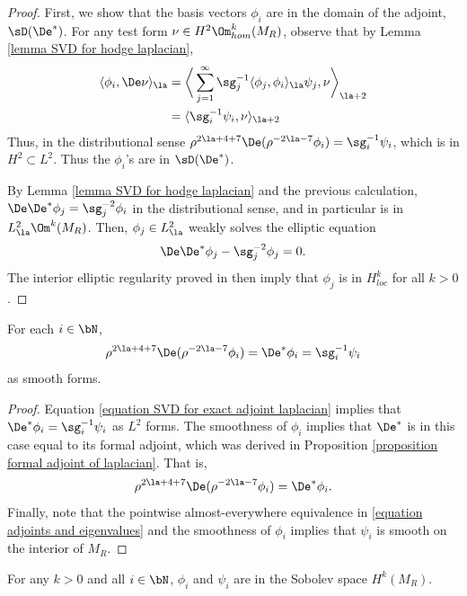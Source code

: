 \documentclass[hidelinks, 12pt, oneside, reqno]{amsart}
\begin{document}
\begin{proof}
First, we show that the basis vectors $\phi_i$ are in the domain of the adjoint, $\sD(\De^*)$. For any test form $\nu \in H^2 \Om^k_{hom}(M_R)$, observe that by Lemma \ref{lemma SVD for hodge laplacian}, 
\begin{align*}
    \langle \phi_i , \De \nu \rangle_{\la} &= \bigg \langle \sum_{j=1}^\infty \sg_j^{-1} \langle \phi_j, \phi_i \rangle_{\la} \psi_j, \nu \bigg\rangle_{\la+2}\\
    &= \langle \sg_i^{-1} \psi_i, \nu \rangle_{\la+2}
\end{align*}
Thus, in the distributional sense $\rho^{2\la + 4 + 7}\De(\rho^{-2\la -7}\phi_i) = \sg_i^{-1} \psi_i$, which is in $H^2 \subset L^2$. Thus the $\phi_i$'s are in $\sD(\De^*)$. 

By Lemma \ref{lemma SVD for hodge laplacian} and the previous calculation, $\De \De^* \phi_j = \sg_j^{-2} \phi_i$ in the distributional sense, and in particular is in $L^2_{\la}\Om^k(M_R)$. Then, $\phi_j \in L^2_{\la}$ weakly solves the elliptic equation 
\[
\De\De^* \phi_j - \sg_j^{-2} \phi_j = 0. 
\]
The interior elliptic regularity proved in \cite[Corollary 10.3.9]{NicolaescuManifoldLectures} then imply that $\phi_j$ is in $H^k_{loc}$ for all $k > 0$. 
\end{proof}

\begin{cor}\label{corollary equality of adjoints}
    For each $i \in \bN$, 
    \begin{equation}\label{equation adjoints and eigenvalues}
    \rho^{2\la + 4 +7} \De (\rho^{-2\la - 7} \phi_i) = \De^* \phi_i = \sg_i^{-1} \psi_i
    \end{equation}
    as smooth forms. 
\end{cor}

\begin{proof}
Equation \eqref{equation SVD for exact adjoint laplacian} implies that $\De^* \phi_i = \sg_i^{-1} \psi_i$ as $L^2$ forms.  The smoothness of $\phi_i$ implies that $\De^*$ is in this case equal to its formal adjoint, which was derived in Proposition \ref{proposition formal adjoint of laplacian}. That is,
\[
\rho^{2\la + 4 +7} \De (\rho^{-2\la - 7} \phi_i) = \De^* \phi_i.
\]
Finally, note that the pointwise almost-everywhere equivalence in \eqref{equation adjoints and eigenvalues} and the smoothness of $\phi_i$ implies that $\psi_i$ is smooth on the interior of $M_R$. 
\end{proof}

\begin{prop}\label{proposition smoothness up to boundary of eigenfunctions}
    For any $k > 0$ and all $i \in \bN$, $\phi_i$ and $\psi_i$ are in the Sobolev space $H^k(M_R)$.
\end{prop}
\end{document}
